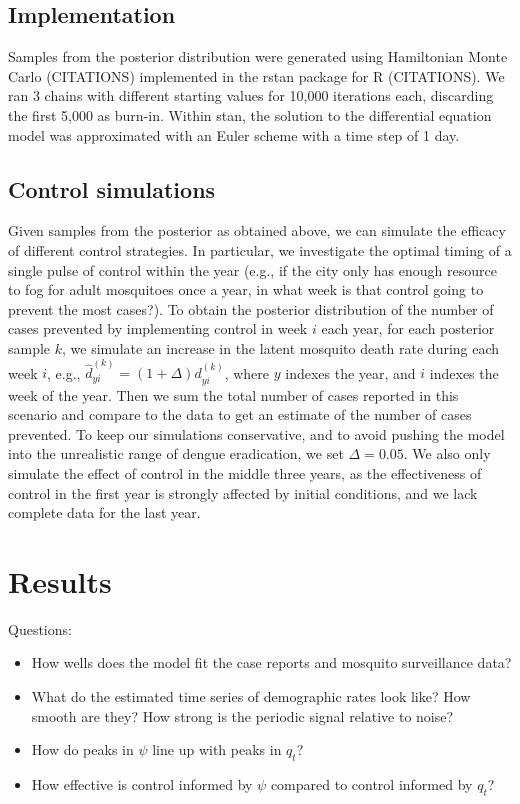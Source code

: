 \documentclass[10pt,letterpaper]{article}
\begin{document}
\subsection*{Implementation}
 
Samples from the posterior distribution were generated using Hamiltonian Monte Carlo (CITATIONS) implemented in the rstan package for R (CITATIONS). 
We ran 3 chains with different starting values for 10,000 iterations each, discarding the first 5,000 as burn-in.
Within stan, the solution to the differential equation model was approximated with an Euler scheme with a time step of 1 day.  

\subsection*{Control simulations}

Given samples from the posterior as obtained above, we can simulate the efficacy of different control strategies.
In particular, we investigate the optimal timing of a single pulse of control within the year (e.g., if the city only has enough resource to fog for adult mosquitoes once a year, in what week is that control going to prevent the most cases?).
To obtain the posterior distribution of the number of cases prevented by implementing control in week $i$ each year, for each posterior sample $k$, we simulate an increase in the latent mosquito death rate during each week $i$, e.g.,
$\hat{d}^{(k)}_{yi} = (1 + \Delta) d^{(k)}_{yi}$, where $y$ indexes the year, and $i$ indexes the week of the year.
Then we sum the total number of cases reported in this scenario and compare to the data to get an estimate of the number of cases prevented.
To keep our simulations conservative, and to avoid pushing the model into the unrealistic range of dengue eradication, we set $\Delta = 0.05$.
We also only simulate the effect of control in the middle three years, as the effectiveness of control in the first year is strongly affected by initial conditions, and we lack complete data for the last year.

\section*{Results}

Questions:
\begin{itemize}
\item How wells does the model fit the case reports and mosquito surveillance data?
\item What do the estimated time series of demographic rates look like? How smooth are they? How strong is the periodic signal relative to noise?
\item How do peaks in $\psi$ line up with peaks in $q_t$?
\item How effective is control informed by $\psi$ compared to control informed by $q_t$?
\end{itemize}
\end{document}
